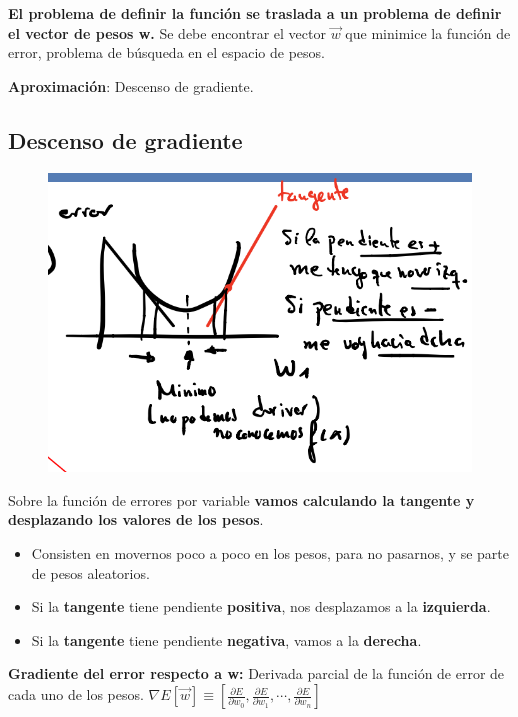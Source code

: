 \documentclass[12pt]{report} %
\begin{document}
\textbf{El problema de definir la función se traslada a un problema de
definir el vector de pesos w.} Se debe encontrar el vector \(\vec{w}\)
que minimice la función de error, problema de búsqueda en el espacio de
pesos.

\textbf{Aproximación}: Descenso de gradiente.

\subsection{Descenso de gradiente}
\begin{figure}[H]
	{\includegraphics[scale=.3]{image-20210305214445428.png}}
\end{figure}
Sobre la función de errores por variable \textbf{vamos calculando la
tangente y desplazando los valores de los pesos}.

\begin{itemize}

\item
  Consisten en movernos poco a poco en los pesos, para no pasarnos, y se
  parte de pesos aleatorios.
\item
  Si la \textbf{tangente} tiene pendiente \textbf{positiva}, nos
  desplazamos a la \textbf{izquierda}.
\item
  Si la \textbf{tangente} tiene pendiente \textbf{negativa}, vamos a la
  \textbf{derecha}.
\end{itemize}

\textbf{Gradiente del error respecto a w:} Derivada parcial de la
función de error de cada uno de los pesos.
\(\nabla E[\vec{w}] \equiv\left[\frac{\partial E}{\partial w_{0}}, \frac{\partial E}{\partial w_{1}}, \cdots ,\frac{\partial E}{\partial w_{n}}\right]\)
\end{document}
